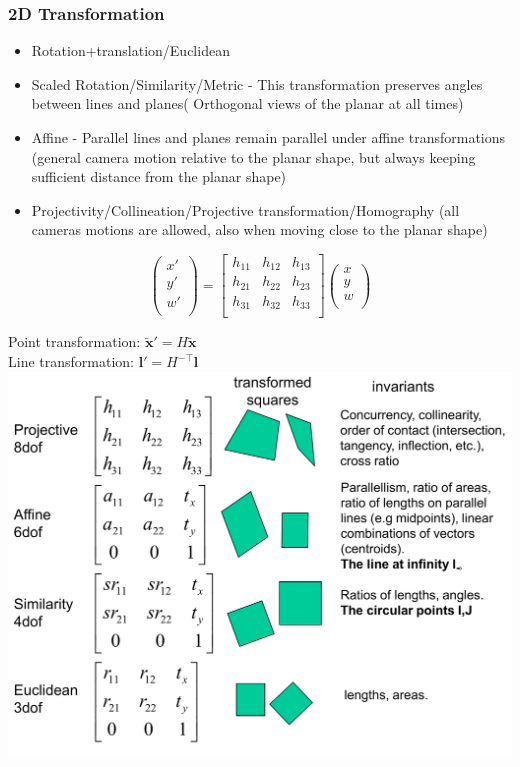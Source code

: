 \subsubsection{2D Transformation}
\begin{itemize}
	\item Rotation+translation/Euclidean
	\item Scaled Rotation/Similarity/Metric - This transformation preserves angles between lines and planes( Orthogonal views of the planar at all times)
	\item Affine - Parallel lines and planes remain parallel under affine transformations (general camera motion relative to the planar shape, but always keeping sufficient distance from the planar shape)
	\item Projectivity/Collineation/Projective transformation/Homography (all cameras motions are allowed, also when moving close to the planar shape)
\end{itemize}

$$\begin{pmatrix}
x'\\
y'\\
w'\\
\end{pmatrix} = \begin{bmatrix}
h_{11}&h_{12}&h_{13}\\
h_{21}&h_{22}&h_{23}\\
h_{31}&h_{32}&h_{33}\\
\end{bmatrix} \begin{pmatrix}
x\\
y\\
w\\
\end{pmatrix} $$

Point transformation: $\bm{\tilde{x}'} = H \bm{\tilde{x}}$\\
Line transformation: $\bm{l'} = H^{-\top} \bm{l}$\\

\includegraphics[width=\columnwidth]{pictures/2Dtransformations}

